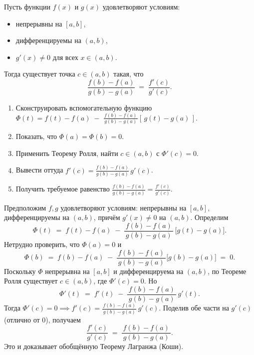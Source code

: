 
\begin{customtheorem}
	Пусть функции $f(x)$ и $g(x)$ удовлетворяют условиям:
	\begin{itemize}
		\item непрерывны на $[a,b]$,
		\item дифференцируемы на $(a,b)$,
		\item $g'(x)\neq 0$ для всех $x\in(a,b)$.
	\end{itemize}
	Тогда существует точка $c\in(a,b)$ такая, что
	\[
		\frac{f(b)-f(a)}{g(b)-g(a)}
		\;=\;
		\frac{f'(c)}{g'(c)}.
	\]
\end{customtheorem}

\begin{proofplan}
	\begin{enumerate}
		\item Сконструировать вспомогательную функцию
		      \(\Phi(t)=f(t)-f(a)\;-\;\tfrac{f(b)-f(a)}{\,g(b)-g(a)\,}[\,g(t)-g(a)\,]\).
		\item Показать, что \(\Phi(a)=\Phi(b)=0\).
		\item Применить Теорему Ролля, найти $c\in(a,b)$ с \(\Phi'(c)=0\).
		\item Вывести оттуда \( f'(c)=\tfrac{f(b)-f(a)}{g(b)-g(a)}\,g'(c)\).
		\item Получить требуемое равенство \(\tfrac{f(b)-f(a)}{g(b)-g(a)}=\tfrac{f'(c)}{g'(c)}.\)
	\end{enumerate}
\end{proofplan}

\begin{customproof}
	Предположим $f,g$ удовлетворяют условиям: непрерывны на $[a,b]$,
	дифференцируемы на $(a,b)$, причём $g'(x)\neq0$ на $(a,b)$.
	Определим
	\[
		\Phi(t)
		\;=\;
		f(t)-f(a)
		\;-\;
		\frac{\,f(b)-f(a)\,}{\,g(b)-g(a)\,}
		\,\bigl[g(t)-g(a)\bigr].
	\]
	Нетрудно проверить, что \(\Phi(a)=0\) и
	\[
		\Phi(b)
		\;=\;
		f(b)-f(a)
		\;-\;
		\frac{\,f(b)-f(a)\,}{\,g(b)-g(a)\,}\bigl[g(b)-g(a)\bigr]
		\;=\;0.
	\]
	Поскольку $\Phi$ непрерывна на $[a,b]$ и дифференцируема на $(a,b)$,
	по Теореме Ролля существует $c\in(a,b)$, где $\Phi'(c)=0$. Но
	\[
		\Phi'(t)
		\;=\; f'(t)
		\;-\;
		\frac{\,f(b)-f(a)\,}{\,g(b)-g(a)\,}\,g'(t).
	\]
	Тогда \(\Phi'(c)=0\implies f'(c)=\tfrac{f(b)-f(a)}{\,g(b)-g(a)\,}\,g'(c)\).
	Поделив обе части на $g'(c)$ (отлично от 0), получаем
	\[
		\frac{f'(c)}{g'(c)}
		\;=\;
		\frac{f(b)-f(a)}{\,g(b)-g(a)\,}.
	\]
	Это и доказывает обобщённую Теорему Лагранжа (Коши).
\end{customproof}

